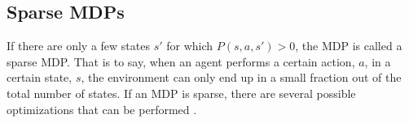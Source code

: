 \subsection{Sparse MDPs}

If there are only a few states $s'$ for which $P(s, a, s') > 0$, the MDP is called a sparse MDP. That is to say, when an agent performs a certain action, $a$, in a certain state, $s$, the environment can only end up in a small fraction out of the total number of states. If an MDP is sparse, there are several possible optimizations that can be performed \parencite{dietterich2013pac}. 
